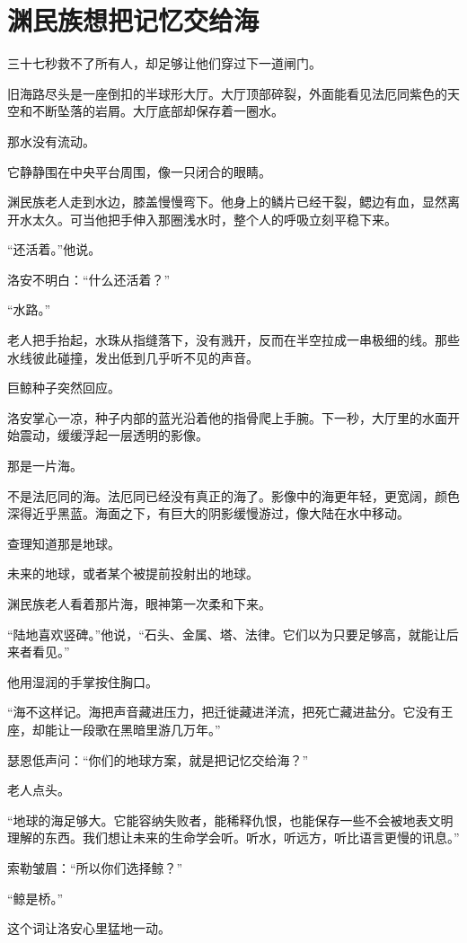 \chapter{渊民族想把记忆交给海}

三十七秒救不了所有人，却足够让他们穿过下一道闸门。

旧海路尽头是一座倒扣的半球形大厅。大厅顶部碎裂，外面能看见法厄同紫色的天空和不断坠落的岩屑。大厅底部却保存着一圈水。

那水没有流动。

它静静围在中央平台周围，像一只闭合的眼睛。

渊民族老人走到水边，膝盖慢慢弯下。他身上的鳞片已经干裂，鳃边有血，显然离开水太久。可当他把手伸入那圈浅水时，整个人的呼吸立刻平稳下来。

“还活着。”他说。

洛安不明白：“什么还活着？”

“水路。”

老人把手抬起，水珠从指缝落下，没有溅开，反而在半空拉成一串极细的线。那些水线彼此碰撞，发出低到几乎听不见的声音。

巨鲸种子突然回应。

洛安掌心一凉，种子内部的蓝光沿着他的指骨爬上手腕。下一秒，大厅里的水面开始震动，缓缓浮起一层透明的影像。

那是一片海。

不是法厄同的海。法厄同已经没有真正的海了。影像中的海更年轻，更宽阔，颜色深得近乎黑蓝。海面之下，有巨大的阴影缓慢游过，像大陆在水中移动。

查理知道那是地球。

未来的地球，或者某个被提前投射出的地球。

渊民族老人看着那片海，眼神第一次柔和下来。

“陆地喜欢竖碑。”他说，“石头、金属、塔、法律。它们以为只要足够高，就能让后来者看见。”

他用湿润的手掌按住胸口。

“海不这样记。海把声音藏进压力，把迁徙藏进洋流，把死亡藏进盐分。它没有王座，却能让一段歌在黑暗里游几万年。”

瑟恩低声问：“你们的地球方案，就是把记忆交给海？”

老人点头。

“地球的海足够大。它能容纳失败者，能稀释仇恨，也能保存一些不会被地表文明理解的东西。我们想让未来的生命学会听。听水，听远方，听比语言更慢的讯息。”

索勒皱眉：“所以你们选择鲸？”

“鲸是桥。”

这个词让洛安心里猛地一动。

